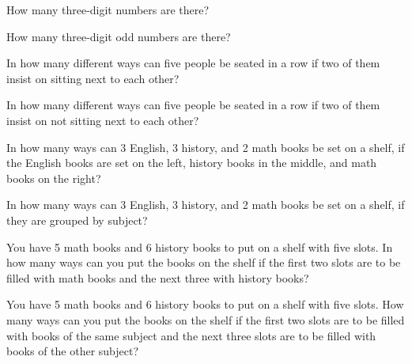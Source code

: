 \begin{puzzle}
    How many three-digit numbers are there?
\end{puzzle}

\begin{puzzle}
    How many three-digit odd numbers are there?
\end{puzzle}

\begin{puzzle}
    In how many different ways can five people be seated in a row if two of them insist on sitting next to each other?
\end{puzzle}

\begin{puzzle}
    In how many different ways can five people be seated in a row if two of them insist on not sitting next to each other?
\end{puzzle}

\begin{puzzle}
    In how many ways can 3 English, 3 history, and 2 math books be set on a shelf, if the English books are set on the left, history books in the middle, and math books on the right?
\end{puzzle}

\begin{puzzle}
    In how many ways can 3 English, 3 history, and 2 math books be set on a shelf, if they are grouped by subject?
\end{puzzle}

\begin{puzzle}
    You have 5 math books and 6 history books to put on a shelf with five slots. In how many ways can you put the books on the shelf if the first two slots are to be filled with math books and the next three with history books?
\end{puzzle}

\begin{puzzle}
    You have 5 math books and 6 history books to put on a shelf with five slots. How many ways can you put the books on the shelf if the first two slots are to be filled with books of the same subject and the next three slots are to be filled with books of the other subject?
\end{puzzle}
